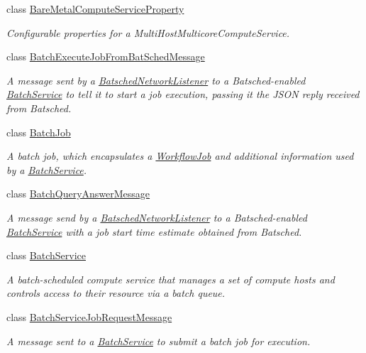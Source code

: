 \begin{DoxyCompactItemize}
class \hyperlink{classwrench_1_1_bare_metal_compute_service_property}{Bare\+Metal\+Compute\+Service\+Property}
\begin{DoxyCompactList}\small\item\em Configurable properties for a Multi\+Host\+Multicore\+Compute\+Service. \end{DoxyCompactList}\item 
class \hyperlink{classwrench_1_1_batch_execute_job_from_bat_sched_message}{Batch\+Execute\+Job\+From\+Bat\+Sched\+Message}
\begin{DoxyCompactList}\small\item\em A message sent by a \hyperlink{classwrench_1_1_batsched_network_listener}{Batsched\+Network\+Listener} to a Batsched-\/enabled \hyperlink{classwrench_1_1_batch_service}{Batch\+Service} to tell it to start a job execution, passing it the J\+S\+ON reply received from Batsched. \end{DoxyCompactList}\item 
class \hyperlink{classwrench_1_1_batch_job}{Batch\+Job}
\begin{DoxyCompactList}\small\item\em A batch job, which encapsulates a \hyperlink{classwrench_1_1_workflow_job}{Workflow\+Job} and additional information used by a \hyperlink{classwrench_1_1_batch_service}{Batch\+Service}. \end{DoxyCompactList}\item 
class \hyperlink{classwrench_1_1_batch_query_answer_message}{Batch\+Query\+Answer\+Message}
\begin{DoxyCompactList}\small\item\em A message send by a \hyperlink{classwrench_1_1_batsched_network_listener}{Batsched\+Network\+Listener} to a Batsched-\/enabled \hyperlink{classwrench_1_1_batch_service}{Batch\+Service} with a job start time estimate obtained from Batsched. \end{DoxyCompactList}\item 
class \hyperlink{classwrench_1_1_batch_service}{Batch\+Service}
\begin{DoxyCompactList}\small\item\em A batch-\/scheduled compute service that manages a set of compute hosts and controls access to their resource via a batch queue. \end{DoxyCompactList}\item 
class \hyperlink{classwrench_1_1_batch_service_job_request_message}{Batch\+Service\+Job\+Request\+Message}
\begin{DoxyCompactList}\small\item\em A message sent to a \hyperlink{classwrench_1_1_batch_service}{Batch\+Service} to submit a batch job for execution. \end{DoxyCompactList}\item 

\end{DoxyCompactItemize}
